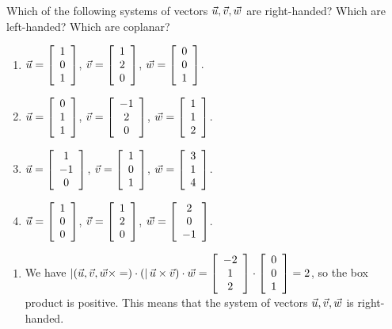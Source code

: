 \documentclass{ximera}
\begin{document}
  
  \begin{example}
    Which of the following systems of vectors
    $\vect{u},\vect{v},\vect{w}$ are right-handed? Which are
    left-handed? Which are coplanar?
    \begin{enumerate}
    \item $\vect{u}=\startmat{c}1\\0\\1\stopmat$, $\vect{v}=\startmat{c}1\\2\\0\stopmat$, $\vect{w}=\startmat{c}0\\0\\1\stopmat$.
    \item $\vect{u}=\startmat{c}0\\1\\1\stopmat$, $\vect{v}=\startmat{c}-1\\2\\0\stopmat$, $\vect{w}=\startmat{c}1\\1\\2\stopmat$.
    \item $\vect{u}=\startmat{c}1\\-1\\0\stopmat$, $\vect{v}=\startmat{c}1\\0\\1\stopmat$, $\vect{w}=\startmat{c}3\\1\\4\stopmat$.
    \item $\vect{u}=\startmat{c}1\\0\\0\stopmat$, $\vect{v}=\startmat{c}1\\2\\0\stopmat$, $\vect{w}=\startmat{c}2\\0\\-1\stopmat$.
    \end{enumerate}
    \begin{solution}
      \begin{enumerate}
      \item We have
        $\boxprod{\vect{u},\vect{v},\vect{w}} = (\vect{u}\times\vect{v})
        \cdot \vect{w} = \startmat{c}-2\\1\\2\stopmat\cdot\startmat{c}0\\0\\1\stopmat=2$, so
        the box product is positive. This means that the system of vectors
        $\vect{u},\vect{v},\vect{w}$ is right-handed.

\end{enumerate}
\end{solution}
\end{example}
\end{document}
